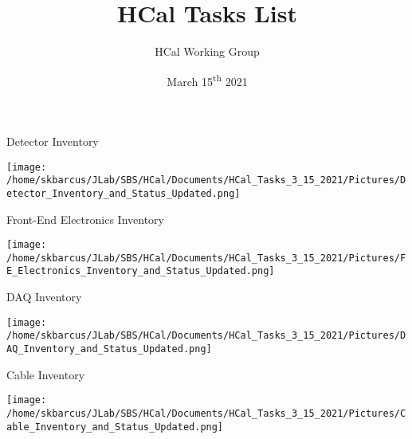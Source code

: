 \documentclass[10pt]{beamer}
\title{HCal Tasks List}
\subtitle{}
\date{March 15\textsuperscript{th} 2021}
\author{HCal Working Group}
\institute{Jefferson Lab}
\begin{document}
\maketitle

\begin{frame}{Detector Inventory}

	\begin{center}
	    \texttt{[image: /home/skbarcus/JLab/SBS/HCal/Documents/HCal\_Tasks\_3\_15\_2021/Pictures/Detector\_Inventory\_and\_Status\_Updated.png]}
  	\end{center}

\end{frame}

\begin{frame}{Front-End Electronics Inventory}

	\begin{center}
	    \texttt{[image: /home/skbarcus/JLab/SBS/HCal/Documents/HCal\_Tasks\_3\_15\_2021/Pictures/FE\_Electronics\_Inventory\_and\_Status\_Updated.png]}
  	\end{center}

\end{frame}

\begin{frame}{DAQ Inventory}

	\begin{center}
	    \texttt{[image: /home/skbarcus/JLab/SBS/HCal/Documents/HCal\_Tasks\_3\_15\_2021/Pictures/DAQ\_Inventory\_and\_Status\_Updated.png]}
  	\end{center}

\end{frame}

\begin{frame}{Cable Inventory}

	\begin{center}
	    \texttt{[image: /home/skbarcus/JLab/SBS/HCal/Documents/HCal\_Tasks\_3\_15\_2021/Pictures/Cable\_Inventory\_and\_Status\_Updated.png]}
  	\end{center}

\end{frame}
\end{document}
